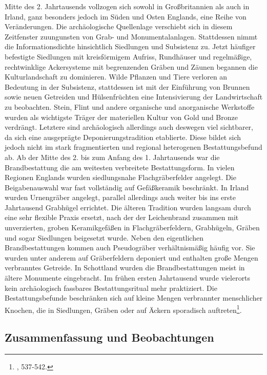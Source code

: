 \documentclass[openany,twoside,twocolumn]{book}
\let\rmarkdownfootnote\footnote%
\def\footnote{\protect\rmarkdownfootnote}
\begin{document}
Mitte des 2. Jahrtausends vollzogen sich sowohl in Großbritannien als
auch in Irland, ganz besonders jedoch im Süden und Osten Englands, eine
Reihe von Veränderungen. Die archäologische Quellenlage verschiebt sich
in diesem Zeitfenster zuungunsten von Grab- und Monumentalanlagen.
Stattdessen nimmt die Informationsdichte hinsichtlich Siedlungen und
Subsistenz zu. Jetzt häufiger befestigte Siedlungen mit kreisförmigem
Aufriss, Rundhäuser und regelmäßige, rechtwinklige Ackersysteme mit
begrenzenden Gräben und Zäunen begannen die Kulturlandschaft zu
dominieren. Wilde Pflanzen und Tiere verloren an Bedeutung in der
Subsistenz, stattdessen ist mit der Einführung von Brunnen sowie neuen
Getreiden und Hülsenfrüchten eine Intensivierung der Landwirtschaft zu
beobachten. Stein, Flint und andere organische und anorganische
Werkstoffe wurden als wichtigste Träger der materiellen Kultur von Gold
und Bronze verdrängt. Letztere sind archäologisch allerdings auch
deswegen viel sichtbarer, da sich eine ausgeprägte Deponierungstradition
etablierte. Diese bildet sich jedoch nicht im stark fragmentierten und
regional heterogenen Bestattungsbefund ab. Ab der Mitte des 2. bis zum
Anfang des 1. Jahrtausends war die Brandbestattung die am weitesten
verbreitete Bestattungsform. In vielen Regionen Englands wurden
siedlungsnahe Flachgräberfelder angelegt. Die Beigabenauswahl war fast
vollständig auf Gefäßkeramik beschränkt. In Irland wurden Urnengräber
angelegt, parallel allerdings auch weiter bis ins erste Jahrtausend
Grabhügel errichtet. Die älteren Tradition wurden langsam durch eine
sehr flexible Praxis ersetzt, nach der der Leichenbrand zusammen mit
unverzierten, groben Keramikgefäßen in Flachgräberfeldern, Grabhügeln,
Gräben und sogar Siedlungen beigesetzt wurde. Neben den eigentlichen
Brandbestattungen kommen auch Pseudogräber verhältnismäßig häufig vor.
Sie wurden unter anderem auf Gräberfeldern deponiert und enthalten große
Mengen verbranntes Getreide. In Schottland wurden die Brandbestattungen
meist in ältere Monumente eingebracht. Im frühen ersten Jahrtausend
wurde vielerorts kein archäologisch fassbares Bestattungsritual mehr
praktiziert. Die Bestattungsbefunde beschränken sich auf kleine Mengen
verbrannter menschlicher Knochen, die in Siedlungen, Gräben oder auf
Äckern sporadisch auftreten\footnote{\textcite{roberts_britain_2013},
  537-542.}.

\hypertarget{zusammenfassung-und-beobachtungen}{%
\subsection{Zusammenfassung und
Beobachtungen}\label{zusammenfassung-und-beobachtungen}}
\end{document}
